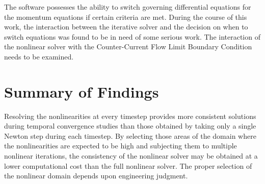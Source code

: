 The \cobra{} software possesses the ability to switch governing differential equations for the momentum equations if certain criteria are met.
During the course of this work, the interaction between the iterative solver and the decision on when to switch equations was found to be in need of some serious work.
The interaction of the nonlinear solver with the Counter-Current Flow Limit Boundary Condition  needs to be examined.

\section{Summary of Findings}
\label{sect:end:summary}
Resolving the nonlinearities at every timestep provides more consistent solutions during temporal convergence studies than those obtained by taking only a single Newton step during each timestep.
By selecting those areas of the domain where the nonlinearities are expected to be high and subjecting them to multiple nonlinear iterations, the consistency of the nonlinear solver may be obtained at a lower computational cost than the full nonlinear solver.
The proper selection of the nonlinear domain depends upon engineering judgment.


